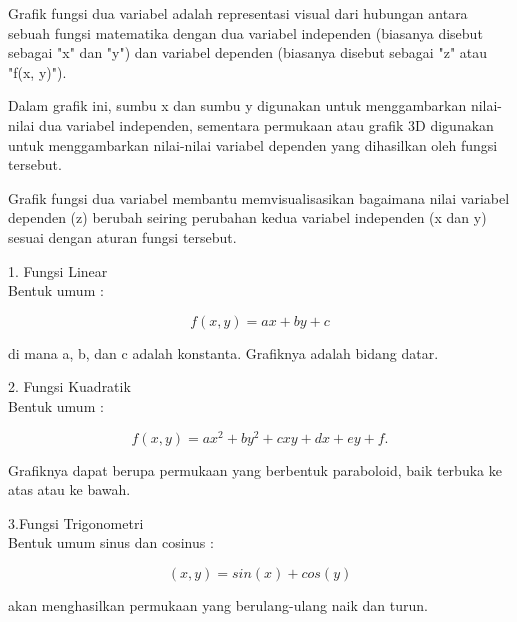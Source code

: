 \documentclass[a4paper,10pt]{article}
\begin{document}
\begin{eulernotebook}
\begin{eulerprompt}
\end{eulerprompt}
\begin{eulercomment}
\end{eulercomment}
\begin{eulercomment}
Grafik fungsi dua variabel adalah representasi visual dari hubungan
antara sebuah fungsi matematika dengan dua variabel independen
(biasanya disebut sebagai "x" dan "y") dan variabel dependen (biasanya
disebut sebagai "z" atau "f(x, y)").

Dalam grafik ini, sumbu x dan sumbu y digunakan untuk menggambarkan
nilai-nilai dua variabel independen, sementara permukaan atau grafik
3D digunakan untuk menggambarkan nilai-nilai variabel dependen yang
dihasilkan oleh fungsi tersebut.

Grafik fungsi dua variabel membantu memvisualisasikan bagaimana nilai
variabel dependen (z) berubah seiring perubahan kedua variabel
independen (x dan y) sesuai dengan aturan fungsi tersebut.

\end{eulercomment}
\begin{eulercomment}
1. Fungsi Linear\\
Bentuk umum :\\
\end{eulercomment}
\begin{eulerformula}
\[
f(x, y) = ax + by + c
\]
\end{eulerformula}
\begin{eulercomment}
di mana a, b, dan c adalah konstanta. Grafiknya adalah bidang datar.

2. Fungsi Kuadratik\\
Bentuk umum :\\
\end{eulercomment}
\begin{eulerformula}
\[
f(x, y) = ax^2 + by^2 + cxy + dx + ey + f.
\]
\end{eulerformula}
\begin{eulercomment}
Grafiknya dapat berupa permukaan yang berbentuk paraboloid, baik
terbuka ke atas atau ke bawah.

3.Fungsi Trigonometri\\
Bentuk umum sinus dan cosinus :\\
\end{eulercomment}
\begin{eulerformula}
\[
(x, y) = sin(x) + cos(y)
\]
\end{eulerformula}
\begin{eulercomment}
akan menghasilkan permukaan yang berulang-ulang naik dan turun.


\end{eulercomment}
\end{eulernotebook}
\end{document}
